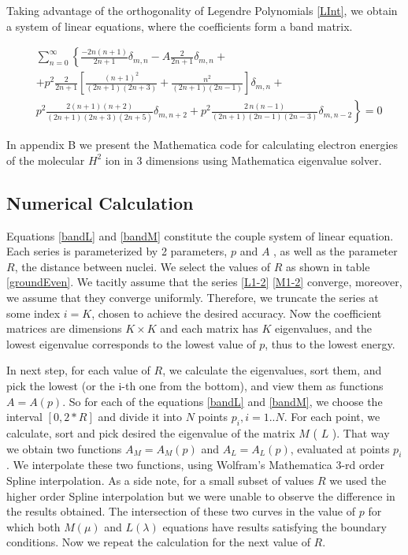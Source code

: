 Taking advantage of the orthogonality of Legendre Polynomials \eqref{LInt}, we obtain a system of linear equations, where the coefficients form a band matrix.

\begin{equation}\label{bandM}
\begin{split}
& \sum_{n=0}^{\infty}\left\{\frac{-2n(n+1)}{2n+1}\delta_{m,n} - A\frac{2}{2n+1}\delta_{m,n} + \right.\\[.8em]
& \left. + p^2\frac{2}{2n+1} \left[ \frac{(n+1)^2}{(2n+1)(2n+3)} + \frac{n^2}{(2n+1)(2n-1)}\right]\delta_{m,n} + \right. \\[.8em] 
& \left.p^2\frac{2(n+1)(n+2)}{(2n+1)(2n+3)(2n+5)}\delta_{m,n+2} +p^2 \frac{2\,n(n-1)}{(2n+1)(2n-1)(2n-3)}\delta_{m,n-2} \right\} = 0
\end{split}
\end{equation}

In appendix B we present the Mathematica code for calculating electron energies of the molecular $ H^2 $ ion in 3 dimensions using Mathematica eigenvalue solver.

\subsection{Numerical Calculation}

Equations \eqref{bandL} and \eqref{bandM} constitute the couple system of linear equation. Each series is parameterized by 2 parameters, $ p $ and $ A $ , as well as the parameter $ R $, the distance between nuclei. We select the values of $ R $ as shown in table \ref{groundEven}. We tacitly assume that the series \eqref{L1-2} \eqref{M1-2} converge, moreover, we assume that they converge uniformly. Therefore, we truncate the series at some index $ i = K $, chosen to achieve the desired accuracy. Now the coefficient matrices are dimensions $ K \times K $ and each matrix has $ K $ eigenvalues, and the lowest eigenvalue corresponds to the lowest value of $ p $, thus to the lowest energy. 

 In next step, for each value of $ R $, we calculate the eigenvalues, sort them, and pick the lowest (or the i-th one from the bottom), and view them as functions $ A = A(p) $. So for each of the equations \eqref{bandL} and \eqref{bandM}, we choose the interval $\left[0, 2 * R \right] $ and divide it into $ N $ points $ p_{i}, i = 1..N $. For each point, we calculate, sort and pick desired the eigenvalue of the matrix $ M $ ( $ L $ ). That way we obtain two  functions $ A_{M} = A_{M}(p) $ and $ A_{L} = A_{L}(p) $, evaluated at points $ p_i $. We interpolate these two functions, using Wolfram's Mathematica 3-rd order Spline interpolation. 
As a side note, for a small subset of values $ R $ we used the higher order Spline interpolation but we were unable to observe the difference in the results obtained.
 The intersection of these two curves in the value of $ p $ for which both $ M(\mu) $ and $ L(\lambda) $ equations have results satisfying the boundary conditions. Now we repeat the calculation for the next value of $ R $.

